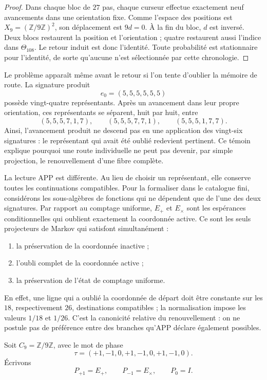 \begin{proof}
Dans chaque bloc de \(27\) pas, chaque curseur effectue exactement neuf
avancements dans une orientation fixe. Comme l'espace des positions est
\(X_9=(\mathbb Z/9\mathbb Z)^2\), son déplacement est \(9d=0\). À la fin
du bloc, \(d\) est inversé. Deux blocs restaurent la position et l'orientation ;
quatre restaurent aussi l'indice dans \(\Theta_{108}\). Le retour induit
est donc l'identité. Toute probabilité est stationnaire pour
l'identité, de sorte qu'aucune n'est sélectionnée par cette chronologie.
\end{proof}

Le problème apparaît même avant le retour si l'on tente d'oublier la
mémoire de route. La signature produit
\[
 e_0=(5,5,5,5,5,5)
\]
possède vingt-quatre représentants. Après un avancement dans leur propre orientation,
ces représentants se séparent, huit par huit, entre
\[
 (5,5,5,7,1,7),\qquad
 (5,5,5,7,7,1),\qquad
 (5,5,5,1,7,7).
\]
Ainsi, l'avancement produit ne descend pas en une application des vingt-six
signatures : le représentant qui avait été oublié redevient pertinent. Ce
témoin explique pourquoi une route individuelle ne peut pas devenir, par simple
projection, le renouvellement d'une fibre complète.

La lecture APP est différente. Au lieu de choisir un représentant, elle conserve toutes
les continuations compatibles. Pour la formaliser dans le catalogue fini,
considérons les sous-algèbres de fonctions qui ne dépendent que de l'une des deux
signatures. Par rapport au comptage uniforme, \(E_+\) et \(E_\times\) sont les
espérances conditionnelles qui oublient exactement la coordonnée active. Ce sont les
seuls projecteurs de Markov qui satisfont simultanément :
\begin{enumerate}
  \item la préservation de la coordonnée inactive ;
  \item l'oubli complet de la coordonnée active ;
  \item la préservation de l'état de comptage uniforme.
\end{enumerate}
En effet, une ligne qui a oublié la coordonnée de départ doit être
constante sur les \(18\), respectivement \(26\), destinations compatibles ; la
normalisation impose les valeurs \(1/18\) et \(1/26\). C'est la canonicité
relative du renouvellement : on ne postule pas de préférence entre des branches qu'APP
déclare également possibles.

Soit \(C_9=\mathbb Z/9\mathbb Z\), avec le mot de phase
\[
 \tau=(+1,-1,0,+1,-1,0,+1,-1,0).
\]
Écrivons
\[
 P_{+1}=E_+,
 \qquad P_{-1}=E_\times,
 \qquad P_0=I.
\]

